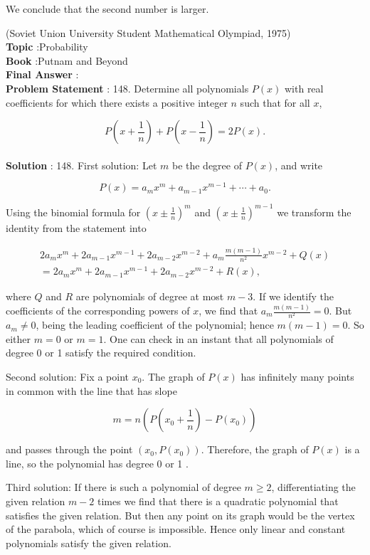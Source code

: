 \documentclass[10pt]{article}
\begin{document}
We conclude that the second number is larger.

(Soviet Union University Student Mathematical Olympiad, 1975) 
\\
\textbf{Topic} :Probability\\
\textbf{Book} :Putnam and Beyond\\
\textbf{Final Answer} :\\


\textbf{Problem Statement} :
148. Determine all polynomials $P(x)$ with real coefficients for which there exists a positive integer $n$ such that for all $x$,

$$
P\left(x+\frac{1}{n}\right)+P\left(x-\frac{1}{n}\right)=2 P(x) .
$$
\\
\textbf{Solution} :
148. First solution: Let $m$ be the degree of $P(x)$, and write

$$
P(x)=a_{m} x^{m}+a_{m-1} x^{m-1}+\cdots+a_{0} .
$$

Using the binomial formula for $\left(x \pm \frac{1}{n}\right)^{m}$ and $\left(x \pm \frac{1}{n}\right)^{m-1}$ we transform the identity from the statement into

$$
\begin{array}{r}
2 a_{m} x^{m}+2 a_{m-1} x^{m-1}+2 a_{m-2} x^{m-2}+a_{m} \frac{m(m-1)}{n^{2}} x^{m-2}+Q(x) \\
=2 a_{m} x^{m}+2 a_{m-1} x^{m-1}+2 a_{m-2} x^{m-2}+R(x),
\end{array}
$$

where $Q$ and $R$ are polynomials of degree at most $m-3$. If we identify the coefficients of the corresponding powers of $x$, we find that $a_{m} \frac{m(m-1)}{n^{2}}=0$. But $a_{m} \neq 0$, being the leading coefficient of the polynomial; hence $m(m-1)=0$. So either $m=0$ or $m=1$. One can check in an instant that all polynomials of degree 0 or 1 satisfy the required condition.

Second solution: Fix a point $x_{0}$. The graph of $P(x)$ has infinitely many points in common with the line that has slope

$$
m=n\left(P\left(x_{0}+\frac{1}{n}\right)-P\left(x_{0}\right)\right)
$$

and passes through the point $\left(x_{0}, P\left(x_{0}\right)\right)$. Therefore, the graph of $P(x)$ is a line, so the polynomial has degree 0 or 1 .

Third solution: If there is such a polynomial of degree $m \geq 2$, differentiating the given relation $m-2$ times we find that there is a quadratic polynomial that satisfies the given relation. But then any point on its graph would be the vertex of the parabola, which of course is impossible. Hence only linear and constant polynomials satisfy the given relation.
\end{document}
